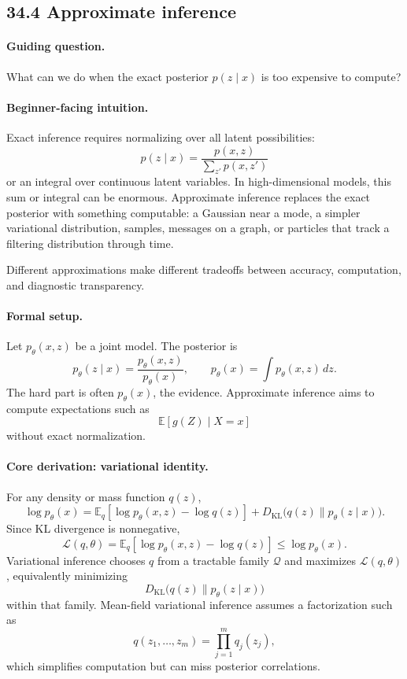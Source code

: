 \subsection{34.4 Approximate inference}

\paragraph{Guiding question.}
What can we do when the exact posterior \(p(z\mid x)\) is too expensive to compute?

\paragraph{Beginner-facing intuition.}
Exact inference requires normalizing over all latent possibilities:
\[
p(z\mid x)=\frac{p(x,z)}{\sum_{z'}p(x,z')}
\]
or an integral over continuous latent variables. In high-dimensional models, this sum or integral can be enormous. Approximate inference replaces the exact posterior with something computable: a Gaussian near a mode, a simpler variational distribution, samples, messages on a graph, or particles that track a filtering distribution through time.

Different approximations make different tradeoffs between accuracy, computation, and diagnostic transparency.

\paragraph{Formal setup.}
Let \(p_\theta(x,z)\) be a joint model. The posterior is
\[
p_\theta(z\mid x)=\frac{p_\theta(x,z)}{p_\theta(x)},
\qquad
p_\theta(x)=\int p_\theta(x,z)\,dz.
\]
The hard part is often \(p_\theta(x)\), the evidence. Approximate inference aims to compute expectations such as
\[
\mathbb E[g(Z)\mid X=x]
\]
without exact normalization.

\paragraph{Core derivation: variational identity.}
For any density or mass function \(q(z)\),
\[
\log p_\theta(x)
=
\mathbb E_q[\log p_\theta(x,z)-\log q(z)]
+D_{\mathrm{KL}}\bigl(q(z)\|p_\theta(z\mid x)\bigr).
\]
Since KL divergence is nonnegative,
\[
\boxed{
\mathcal L(q,\theta)
=\mathbb E_q[\log p_\theta(x,z)-\log q(z)]
\leq \log p_\theta(x).
}
\]
Variational inference chooses \(q\) from a tractable family \(\mathcal Q\) and maximizes \(\mathcal L(q,\theta)\), equivalently minimizing
\[
D_{\mathrm{KL}}\bigl(q(z)\|p_\theta(z\mid x)\bigr)
\]
within that family. Mean-field variational inference assumes a factorization such as
\[
q(z_1,\ldots,z_m)=\prod_{j=1}^m q_j(z_j),
\]
which simplifies computation but can miss posterior correlations.

